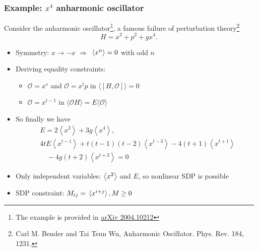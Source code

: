 \documentclass{beamer}
\begin{document}
\begin{frame}
\end{frame}

\begin{frame}
\frametitle{Example: $x^4$ anharmonic oscillator}

Consider the anharmonic oscillator\footnote{The example is provided in \href{https://arxiv.org/abs/2004.10212}{arXiv 2004.10212}}, a famous failure of perturbation theory\footnote{Carl M. Bender and Tai Tsun Wu, Anharmonic Oscillator. Phys. Rev. 184, 1231.}
\begin{equation}
    H = x^2 + p^2 + g x^4.
\end{equation}

\begin{itemize}
    \item Symmetry: $x \to -x$ $\Rightarrow$ $\expval*{x^n} = 0$ with odd $n$
    \item Deriving equality constraints:
    \begin{itemize}
        \item $\mathcal{O}=x^{s}$ and $\mathcal{O}=x^{t} p$ in $\langle[H, \mathcal{O}]\rangle=0$ 
        \item $\mathcal{O}=x^{t-1}$ in $\langle\mathcal{O} H\rangle=E\langle\mathcal{O}\rangle$
    \end{itemize}
    \item So finally we have
        \begin{equation}
            \begin{aligned}
                &E=2\left\langle x^{2}\right\rangle+3 g\left\langle x^{4}\right\rangle, \\
                &4 t E\left\langle x^{t-1}\right\rangle +t(t-1)(t-2)\left\langle x^{t-3}\right\rangle -4(t+1)\left\langle x^{t+1}\right\rangle \\
                &\quad -4 g(t+2)\left\langle x^{t+3}\right\rangle=0 
            \end{aligned}
        \end{equation}
    \item Only independent variables: $\expval{x^2}$ and $E$, so nonlinear SDP is possible
    \item SDP constraint: $M_{ij} = \expval*{x^{i+j}}, M \geq 0$
\end{itemize}

\end{frame}
\end{document}
